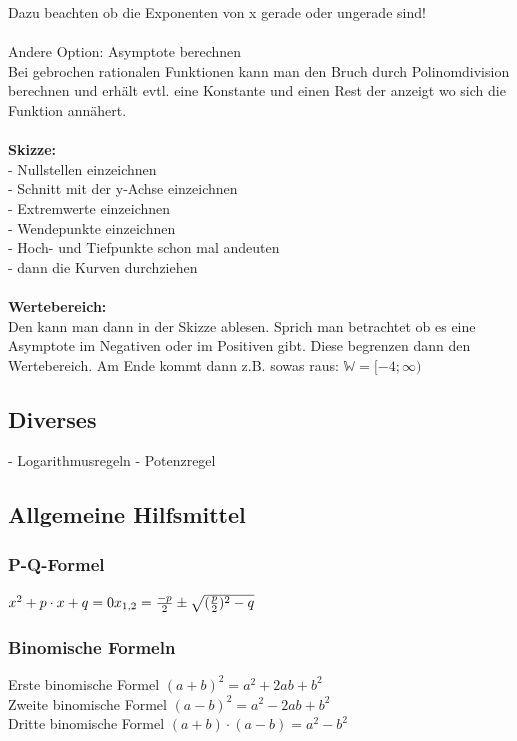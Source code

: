 \documentclass[6pt,a4paper]{scrartcl}
\begin{document}
\begin{multicols*}{2}
Dazu beachten ob die Exponenten von x gerade oder ungerade sind!\\
\\
Andere Option: Asymptote berechnen\\
Bei gebrochen rationalen Funktionen kann man den Bruch durch Polinomdivision berechnen und erhält evtl. eine Konstante und einen Rest der anzeigt wo sich die Funktion annähert.\\
\\
\textbf{Skizze:}\\
- Nullstellen einzeichnen\\
- Schnitt mit der y-Achse einzeichnen\\
- Extremwerte einzeichnen\\
- Wendepunkte einzeichnen\\
- Hoch- und Tiefpunkte schon mal andeuten\\
- dann die Kurven durchziehen\\
\\
\textbf{Wertebereich:}\\
Den kann man dann in der Skizze ablesen. Sprich man betrachtet ob es eine Asymptote im Negativen oder im Positiven gibt. Diese begrenzen dann den Wertebereich. Am Ende kommt dann z.B. sowas raus: $\mathbb{W} = [-4; \infty)$
\subsection{Diverses}
- Logarithmusregeln
- Potenzregel

\subsection{Allgemeine Hilfsmittel}
\subsubsection{P-Q-Formel}
$
x^2 + p\cdot x + q = 0\\
{x}_{1,2} = \frac{-p}{2} \pm \sqrt{(\frac{p}{2})^2 - q}
$
\subsubsection{Binomische Formeln}
Erste binomische Formel $(a+b)^{2}=a^{2} + 2ab + b^{2}$ \\
Zweite binomische Formel $(a-b)^{2}=a^{2} - 2ab + b^{2}$ \\
Dritte binomische Formel $(a+b)\cdot (a-b)=a^{2}-b^{2}$ \\



\end{multicols*}
\end{document}

